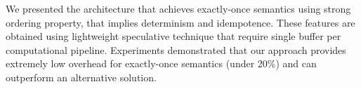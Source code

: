 \label {fs-short-conclusion}

We presented the architecture that achieves exactly-once semantics using strong ordering property, that implies determinism and idempotence. These features are obtained using lightweight speculative technique that require single buffer per computational pipeline. Experiments demonstrated that our approach provides extremely low overhead for exactly-once semantics (under 20\%) and can outperform an alternative solution.